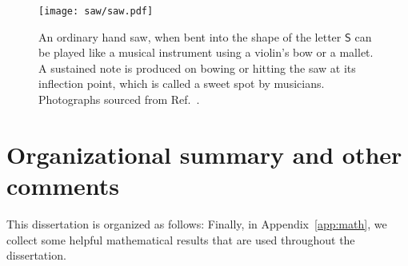 \begin{figure}
  \begin{center}
    \texttt{[image: saw/saw.pdf]}
  \end{center}
  \caption{%
    An ordinary hand saw, when bent into the shape of the letter $\mathsf{S}$ can be played like a musical instrument using a violin's bow or a mallet.
    A sustained note is produced on bowing or hitting the saw at its inflection point, which is called a sweet spot by musicians.
    Photographs sourced from Ref.~\cite{shankar2022}.
  }
  \label{fig:saw}
\end{figure}

\section{Organizational summary and other comments}

This dissertation is organized as follows:
Finally, in Appendix~\ref{app:math}, we collect some helpful mathematical results that are used throughout the dissertation.
